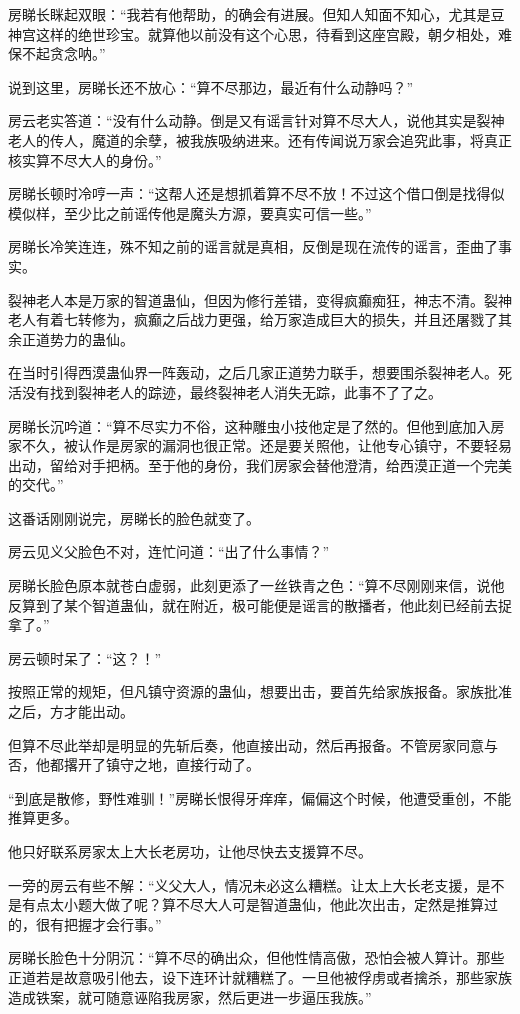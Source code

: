 \begin{this_body}
房睇长眯起双眼：“我若有他帮助，的确会有进展。但知人知面不知心，尤其是豆神宫这样的绝世珍宝。就算他以前没有这个心思，待看到这座宫殿，朝夕相处，难保不起贪念呐。”

说到这里，房睇长还不放心：“算不尽那边，最近有什么动静吗？”

房云老实答道：“没有什么动静。倒是又有谣言针对算不尽大人，说他其实是裂神老人的传人，魔道的余孽，被我族吸纳进来。还有传闻说万家会追究此事，将真正核实算不尽大人的身份。”

房睇长顿时冷哼一声：“这帮人还是想抓着算不尽不放！不过这个借口倒是找得似模似样，至少比之前谣传他是魔头方源，要真实可信一些。”

房睇长冷笑连连，殊不知之前的谣言就是真相，反倒是现在流传的谣言，歪曲了事实。

裂神老人本是万家的智道蛊仙，但因为修行差错，变得疯癫痴狂，神志不清。裂神老人有着七转修为，疯癫之后战力更强，给万家造成巨大的损失，并且还屠戮了其余正道势力的蛊仙。

在当时引得西漠蛊仙界一阵轰动，之后几家正道势力联手，想要围杀裂神老人。死活没有找到裂神老人的踪迹，最终裂神老人消失无踪，此事不了了之。

房睇长沉吟道：“算不尽实力不俗，这种雕虫小技他定是了然的。但他到底加入房家不久，被认作是房家的漏洞也很正常。还是要关照他，让他专心镇守，不要轻易出动，留给对手把柄。至于他的身份，我们房家会替他澄清，给西漠正道一个完美的交代。”

这番话刚刚说完，房睇长的脸色就变了。

房云见义父脸色不对，连忙问道：“出了什么事情？”

房睇长脸色原本就苍白虚弱，此刻更添了一丝铁青之色：“算不尽刚刚来信，说他反算到了某个智道蛊仙，就在附近，极可能便是谣言的散播者，他此刻已经前去捉拿了。”

房云顿时呆了：“这？！”

按照正常的规矩，但凡镇守资源的蛊仙，想要出击，要首先给家族报备。家族批准之后，方才能出动。

但算不尽此举却是明显的先斩后奏，他直接出动，然后再报备。不管房家同意与否，他都撂开了镇守之地，直接行动了。

“到底是散修，野性难驯！”房睇长恨得牙痒痒，偏偏这个时候，他遭受重创，不能推算更多。

他只好联系房家太上大长老房功，让他尽快去支援算不尽。

一旁的房云有些不解：“义父大人，情况未必这么糟糕。让太上大长老支援，是不是有点太小题大做了呢？算不尽大人可是智道蛊仙，他此次出击，定然是推算过的，很有把握才会行事。”

房睇长脸色十分阴沉：“算不尽的确出众，但他性情高傲，恐怕会被人算计。那些正道若是故意吸引他去，设下连环计就糟糕了。一旦他被俘虏或者擒杀，那些家族造成铁案，就可随意诬陷我房家，然后更进一步逼压我族。”


\end{this_body}

